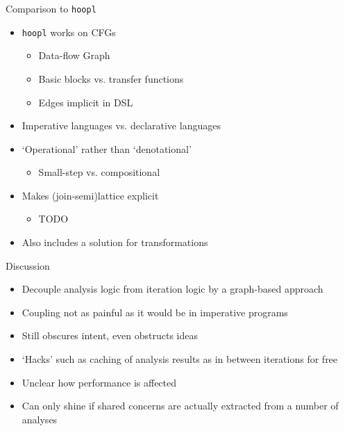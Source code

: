 \documentclass{haskellbeamer}
\begin{document}
\begin{frame}{Comparison to \texttt{hoopl}}
  \begin{itemize}
    \item \texttt{hoopl} \parencite{hoopl} works on CFGs
      \begin{itemize}
        \item Data-flow Graph
        \item Basic blocks vs. transfer functions
        \item Edges implicit in DSL 
      \end{itemize}
    \item Imperative languages vs. declarative languages
    \item `Operational' rather than `denotational'
      \begin{itemize}
        \item Small-step vs. compositional
      \end{itemize}
    \item Makes (join-semi)lattice explicit
      \begin{itemize}
        \item TODO
      \end{itemize}
    \item Also includes a solution for transformations
  \end{itemize}
\end{frame}

\begin{frame}{Discussion}
  \begin{itemize}
    \item[\cmark] Decouple analysis logic from iteration logic by a graph-based approach
    \item[\xmark] Coupling not as painful as it would be in imperative programs
    \item[\cmark] Still obscures intent, even obstructs ideas
    \item[\cmark] `Hacks' such as caching of analysis results as in \textcite[§9.2]{dmd} between iterations for free
    \item[\xmark] Unclear how performance is affected
    \item[\xmark] Can only shine if shared concerns are actually extracted from a number of analyses
  \end{itemize}
\end{frame}
\end{document}

